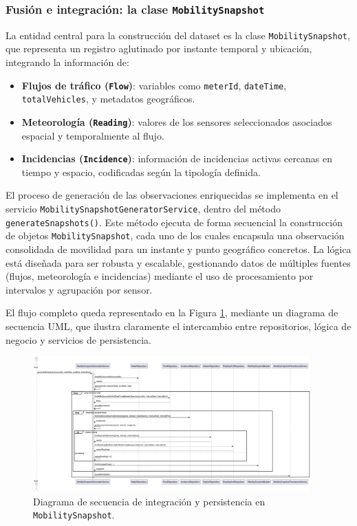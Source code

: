 \subsubsection*{Fusión e integración: la clase \texttt{MobilitySnapshot}}

La entidad central para la construcción del dataset es la clase \texttt{MobilitySnapshot}, que representa un registro aglutinado por instante temporal y ubicación, integrando la información de:

\begin{itemize}
	\item \textbf{Flujos de tráfico (\texttt{Flow})}: variables como \texttt{meterId}, \texttt{dateTime}, \texttt{totalVehicles}, y metadatos geográficos.
	\item \textbf{Meteorología (\texttt{Reading})}: valores de los sensores seleccionados asociados espacial y temporalmente al flujo.
	\item \textbf{Incidencias (\texttt{Incidence})}: información de incidencias activas cercanas en tiempo y espacio, codificadas según la tipología definida.
\end{itemize}

El proceso de generación de las observaciones enriquecidas se implementa en el servicio \texttt{MobilitySnapshotGeneratorService}, dentro del método \texttt{generateSnapshots()}. Este método ejecuta de forma secuencial la construcción de objetos \texttt{MobilitySnapshot}, cada uno de los cuales encapsula una observación consolidada de movilidad para un instante y punto geográfico concretos. La lógica está diseñada para ser robusta y escalable, gestionando datos de múltiples fuentes (flujos, meteorología e incidencias) mediante el uso de procesamiento por intervalos y agrupación por sensor.

El flujo completo queda representado en la Figura \ref{fig:sequence_mobility_snapshot}, mediante un diagrama de secuencia UML, que ilustra claramente el intercambio entre repositorios, lógica de negocio y servicios de persistencia.

\begin{figure}[H]
	\centering
	\includegraphics[width=0.95\textwidth]{includes/snapshot_generator_sequence.png}
	\caption{Diagrama de secuencia de integración y persistencia en \texttt{MobilitySnapshot}.}
	\label{fig:sequence_mobility_snapshot}
\end{figure}

